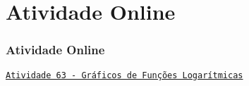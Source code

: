 \section{Atividade Online}
\begin{frame}
\frametitle{Atividade Online} 

\href{https://pt.khanacademy.org/math/algebra2/exponential-and-logarithmic-functions/graphs-of-logarithmic-functions/e/graphs-of-exponentials-and-logarithms}
{{\tt Atividade 63 - Gráficos de Funções Logarítmicas}}




\end{frame}